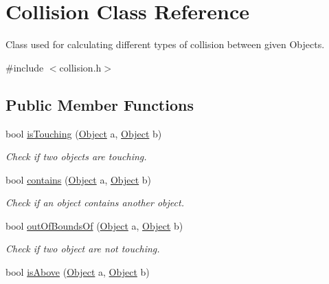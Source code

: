 \hypertarget{classCollision}{}\section{Collision Class Reference}
\label{classCollision}


Class used for calculating different types of collision between given Objects.  




{\ttfamily \#include $<$collision.\+h$>$}

\subsection*{Public Member Functions}
\begin{DoxyCompactItemize}
\item 
bool \hyperlink{classCollision_ae005eb1d857f6127b2673aecacbbd03f}{is\+Touching} (\hyperlink{classObject}{Object} a, \hyperlink{classObject}{Object} b)\hypertarget{classCollision_ae005eb1d857f6127b2673aecacbbd03f}{}\label{classCollision_ae005eb1d857f6127b2673aecacbbd03f}

\begin{DoxyCompactList}\small\item\em Check if two objects are touching. \end{DoxyCompactList}\item 
bool \hyperlink{classCollision_a2ccec68bed3147982c829327b4083dc6}{contains} (\hyperlink{classObject}{Object} a, \hyperlink{classObject}{Object} b)\hypertarget{classCollision_a2ccec68bed3147982c829327b4083dc6}{}\label{classCollision_a2ccec68bed3147982c829327b4083dc6}

\begin{DoxyCompactList}\small\item\em Check if an object contains another object. \end{DoxyCompactList}\item 
bool \hyperlink{classCollision_a4fae301767751ae007e953d1d2f49e7b}{out\+Of\+Bounds\+Of} (\hyperlink{classObject}{Object} a, \hyperlink{classObject}{Object} b)\hypertarget{classCollision_a4fae301767751ae007e953d1d2f49e7b}{}\label{classCollision_a4fae301767751ae007e953d1d2f49e7b}

\begin{DoxyCompactList}\small\item\em Check if two object are not touching. \end{DoxyCompactList}\item 
bool \hyperlink{classCollision_aecbf1758ca3a93a39568dbdf87213f20}{is\+Above} (\hyperlink{classObject}{Object} a, \hyperlink{classObject}{Object} b)\hypertarget{classCollision_aecbf1758ca3a93a39568dbdf87213f20}{}\label{classCollision_aecbf1758ca3a93a39568dbdf87213f20}


\end{DoxyCompactItemize}
